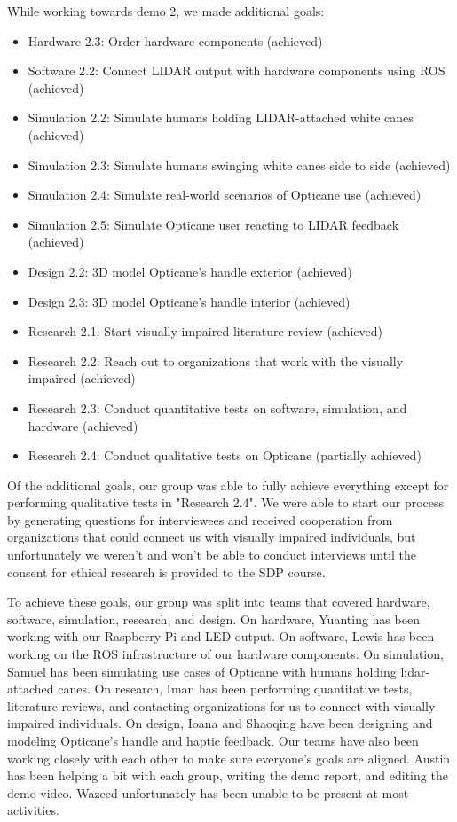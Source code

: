 \documentclass{article}
\begin{document}
While working towards demo 2, we made additional goals:
\begin{itemize}
  \item Hardware 2.3: Order hardware components (achieved)
  \item Software 2.2: Connect LIDAR output with hardware components using ROS (achieved)
  \item Simulation 2.2: Simulate humans holding LIDAR-attached white canes (achieved)
  \item Simulation 2.3: Simulate humans swinging white canes side to side (achieved)
  \item Simulation 2.4: Simulate real-world scenarios of Opticane use (achieved)
  \item Simulation 2.5: Simulate Opticane user reacting to LIDAR feedback (achieved)
  \item Design 2.2: 3D model Opticane's handle exterior (achieved)
  \item Design 2.3: 3D model Opticane's handle interior (achieved)
  \item Research 2.1: Start visually impaired literature review (achieved)
  \item Research 2.2: Reach out to organizations that work with the visually impaired (achieved)
  \item Research 2.3: Conduct quantitative tests on software, simulation, and hardware (achieved)
  \item Research 2.4: Conduct qualitative tests on Opticane (partially achieved)
\end{itemize}

Of the additional goals, our group was able to fully achieve everything except for performing qualitative tests in "Research 2.4". We were able to start our process by generating questions for interviewees and received cooperation from organizations that could connect us with visually impaired individuals, but unfortunately we weren't and won't be able to conduct interviews until the consent for ethical research is provided to the SDP course.

To achieve these goals, our group was split into teams that covered hardware, software, simulation, research, and design. On hardware, Yuanting has been working with our Raspberry Pi and LED output. On software, Lewis has been working on the ROS infrastructure of our hardware components. On simulation, Samuel has been simulating use cases of Opticane with humans holding lidar-attached canes. On research, Iman has been performing quantitative tests, literature reviews, and contacting organizations for us to connect with visually impaired individuals. On design, Ioana and Shaoqing have been designing and modeling Opticane's handle and haptic feedback. Our teams have also been working closely with each other to make sure everyone's goals are aligned. Austin has been helping a bit with each group, writing the demo report, and editing the demo video. Wazeed unfortunately has been unable to be present at most activities.
\end{document}
